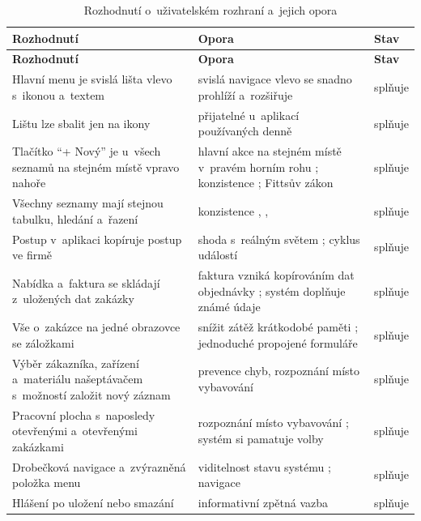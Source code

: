 \begin{longtable}{p{}p{}p{}}
\caption{Rozhodnutí o~uživatelském rozhraní a~jejich opora}\label{tab:ui-soulad}\\
\hline \textbf{Rozhodnutí} & \textbf{Opora} & \textbf{Stav} \\ \hline\endfirsthead
\hline \textbf{Rozhodnutí} & \textbf{Opora} & \textbf{Stav} \\ \hline\endhead
Hlavní menu je svislá lišta vlevo s~ikonou a~textem & svislá navigace vlevo se snadno prohlíží a~rozšiřuje \cite{Laubheimer2021} & splňuje \\
Lištu lze sbalit jen na ikony & přijatelné u~aplikací používaných denně \cite{Laubheimer2021} & splňuje \\
Tlačítko \enquote{+ Nový} je u~všech seznamů na stejném místě vpravo nahoře & hlavní akce na stejném místě v~pravém horním rohu \cite{Kaplan2021}; konzistence \cite[s.~2328]{Sajedi2011}; Fittsův zákon \cite[s.~2330]{Sajedi2011} & splňuje \\
Všechny seznamy mají stejnou tabulku, hledání a~řazení & konzistence \cite{Nielsen-heuristiky}, \cite{Shneiderman-pravidla}, \cite[s.~2328]{Sajedi2011} & splňuje \\
Postup v~aplikaci kopíruje postup ve firmě & shoda s~reálným světem \cite{Nielsen-heuristiky}; cyklus událostí \cite[s.~56]{MonkWagner2013} & splňuje \\
Nabídka a~faktura se skládají z~uložených dat zakázky & faktura vzniká kopírováním dat objednávky \cite[s.~57]{MonkWagner2013}; systém doplňuje známé údaje \cite[s.~2331--2332]{Sajedi2011} & splňuje \\
Vše o~zakázce na jedné obrazovce se záložkami & snížit zátěž krátkodobé paměti \cite{Shneiderman-pravidla}; jednoduché propojené formuláře \cite[s.~2330]{Sajedi2011} & splňuje \\
Výběr zákazníka, zařízení a~materiálu našeptávačem s~možností založit nový záznam & prevence chyb, rozpoznání místo vybavování \cite{Nielsen-heuristiky} & splňuje \\
Pracovní plocha s~naposledy otevřenými a~otevřenými zakázkami & rozpoznání místo vybavování \cite{Nielsen-heuristiky}; systém si pamatuje volby \cite[s.~2331--2332]{Sajedi2011} & splňuje \\
Drobečková navigace a~zvýrazněná položka menu & viditelnost stavu systému \cite{Nielsen-heuristiky}; navigace \cite[s.~2332--2333]{Sajedi2011} & splňuje \\
Hlášení po uložení nebo smazání & informativní zpětná vazba \cite{Shneiderman-pravidla} & splňuje \\

\end{longtable}
